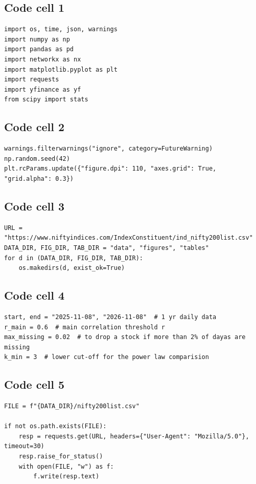 \documentclass[12pt,a4paper]{report}
\begin{document}
\subsection*{Code cell 1}
\begin{lstlisting}[style=fancy]
import os, time, json, warnings
import numpy as np
import pandas as pd
import networkx as nx
import matplotlib.pyplot as plt
import requests
import yfinance as yf
from scipy import stats
\end{lstlisting}

\subsection*{Code cell 2}
\begin{lstlisting}[style=fancy]
warnings.filterwarnings("ignore", category=FutureWarning)
np.random.seed(42)
plt.rcParams.update({"figure.dpi": 110, "axes.grid": True, "grid.alpha": 0.3})
\end{lstlisting}

\subsection*{Code cell 3}
\begin{lstlisting}[style=fancy]
URL = "https://www.niftyindices.com/IndexConstituent/ind_nifty200list.csv"
DATA_DIR, FIG_DIR, TAB_DIR = "data", "figures", "tables"
for d in (DATA_DIR, FIG_DIR, TAB_DIR):
    os.makedirs(d, exist_ok=True)
\end{lstlisting}

\subsection*{Code cell 4}
\begin{lstlisting}[style=fancy]
start, end = "2025-11-08", "2026-11-08"  # 1 yr daily data
r_main = 0.6  # main correlation threshold r
max_missing = 0.02  # to drop a stock if more than 2% of dayas are missing
k_min = 3  # lower cut-off for the power law comparision
\end{lstlisting}

\subsection*{Code cell 5}
\begin{lstlisting}[style=fancy]
FILE = f"{DATA_DIR}/nifty200list.csv"

if not os.path.exists(FILE):
    resp = requests.get(URL, headers={"User-Agent": "Mozilla/5.0"}, timeout=30)
    resp.raise_for_status()
    with open(FILE, "w") as f:
        f.write(resp.text)
\end{lstlisting}
\end{document}
